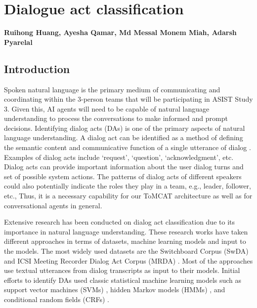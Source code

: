 \chapter{Dialogue act classification}
\label{ch:da_classification}
\textbf{Ruihong Huang, Ayesha Qamar, Md Messal Monem Miah, Adarsh Pyarelal}

\section{Introduction}

Spoken natural language is the primary medium of communicating and coordinating
within the 3-person teams that will be participating in ASIST Study 3.  Given
this, AI agents will need to be capable of natural language understanding to
process the conversations to make informed and prompt decisions. Identifying
dialog acts (DAs) is one of the primary aspects of natural language
understanding. A dialog act can be identified as a method of defining the
semantic content and communicative function of a single utterance of dialog
\citep{Searle:1969}. Examples of dialog acts include `request', `question',
`acknowledgment', etc.
Dialog acts can provide important information about the user dialog turns and
set of possible system actions. The patterns of dialog acts
of different speakers could also potentially indicate the roles they play in a
team, e.g., leader, follower, etc., Thus, it is a necessary capability for our
ToMCAT architecture as well as for conversational agents in general.

Extensive research has been conducted on dialog act classification due to its
importance in natural language understanding. These research works have taken
different approaches in terms of datasets, machine learning models and input to
the models. The most widely used datasets are the Switchboard
Corpus (SwDA) and ICSI Meeting Recorder Dialog Act Corpus (MRDA)
\citep{Shriberg.ea:2004}. Most of the approaches use textual utterances from
dialog transcripts as input to their models. Initial efforts to identify DAs
used classic statistical machine learning models
such as support vector machines (SVMs) \citep{Henderson.ea:2012}, hidden Markov
models (HMMs) \citep{Stolcke.ea:2000}, and conditional random fields (CRFs)
\citep{Zimmermann:2009}.

